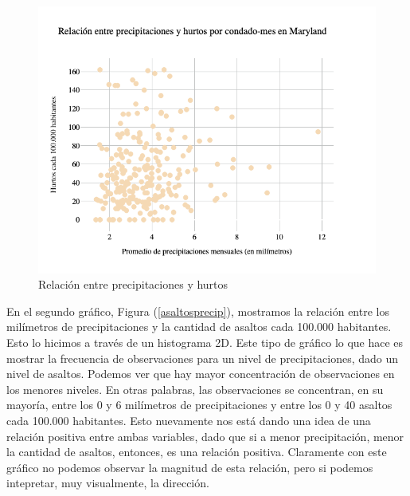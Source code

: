 \documentclass[12pt]{article}
\begin{document}
\begin{figure}[htbp]
    \centering
    \includegraphics[width = \textwidth]{graficos/Precip_Theft.png}
    \caption{Relaci\'on entre precipitaciones y hurtos}
    \label{hurtosprecip}
\end{figure}

En el segundo gr\'afico, Figura (\ref{asaltosprecip}), mostramos la relaci\'on entre los mil\'imetros de precipitaciones y la cantidad de asaltos cada 100.000 habitantes. Esto lo hicimos a trav\'es de un histograma 2D. Este tipo de gr\'afico lo que hace es mostrar la frecuencia de observaciones para un nivel de precipitaciones, dado un nivel de asaltos. Podemos ver que hay mayor concentraci\'on de observaciones en los menores niveles. En otras palabras, las observaciones se concentran, en su mayor\'ia, entre los 0 y 6 mil\'imetros de precipitaciones y entre los 0 y 40 asaltos cada 100.000 habitantes. Esto nuevamente nos est\'a dando una idea de una relaci\'on positiva entre ambas variables, dado que si a menor precipitaci\'on, menor la cantidad de asaltos, entonces, es una relaci\'on positiva. Claramente con este gr\'afico no podemos observar la magnitud de esta relaci\'on, pero si podemos intepretar, muy visualmente, la direcci\'on.
\end{document}
